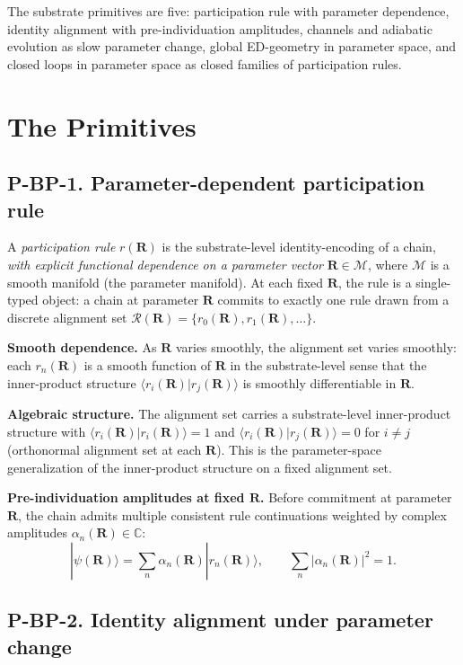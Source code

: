 \documentclass[11pt,a4paper]{article}
\begin{document}
The substrate primitives are five: participation rule with parameter dependence, identity alignment with pre-individuation amplitudes, channels and adiabatic evolution as slow parameter change, global ED-geometry in parameter space, and closed loops in parameter space as closed families of participation rules.

\section{The Primitives}

\subsection{P-BP-1. Parameter-dependent participation rule}

A \emph{participation rule} $r(\mathbf{R})$ is the substrate-level identity-encoding of a chain, \emph{with explicit functional dependence on a parameter vector} $\mathbf{R} \in \mathcal{M}$, where $\mathcal{M}$ is a smooth manifold (the parameter manifold). At each fixed $\mathbf{R}$, the rule is a single-typed object: a chain at parameter $\mathbf{R}$ commits to exactly one rule drawn from a discrete alignment set $\mathcal{R}(\mathbf{R}) = \{r_0(\mathbf{R}), r_1(\mathbf{R}), \ldots\}$.

\textbf{Smooth dependence.} As $\mathbf{R}$ varies smoothly, the alignment set varies smoothly: each $r_n(\mathbf{R})$ is a smooth function of $\mathbf{R}$ in the substrate-level sense that the inner-product structure $\langle r_i(\mathbf{R})|r_j(\mathbf{R})\rangle$ is smoothly differentiable in $\mathbf{R}$.

\textbf{Algebraic structure.} The alignment set carries a substrate-level inner-product structure with $\langle r_i(\mathbf{R})|r_i(\mathbf{R})\rangle = 1$ and $\langle r_i(\mathbf{R})|r_j(\mathbf{R})\rangle = 0$ for $i \neq j$ (orthonormal alignment set at each $\mathbf{R}$). This is the parameter-space generalization of the inner-product structure on a fixed alignment set.

\textbf{Pre-individuation amplitudes at fixed $\mathbf{R}$.} Before commitment at parameter $\mathbf{R}$, the chain admits multiple consistent rule continuations weighted by complex amplitudes $\alpha_n(\mathbf{R}) \in \mathbb{C}$:
\[
|\psi(\mathbf{R})\rangle = \sum_n \alpha_n(\mathbf{R}) |r_n(\mathbf{R})\rangle, \qquad \sum_n |\alpha_n(\mathbf{R})|^{2} = 1.
\]

\subsection{P-BP-2. Identity alignment under parameter change}
\end{document}
